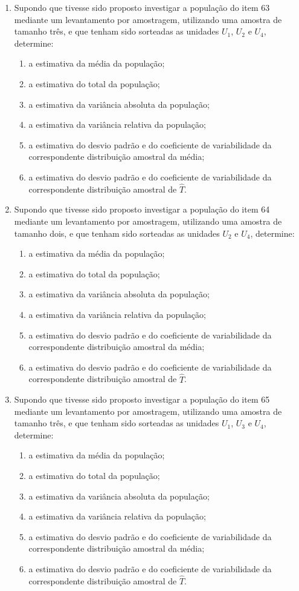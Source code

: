 \begin{enumerate}[resume]
\item Supondo que tivesse sido proposto investigar a população do item 63 mediante um levantamento por amostragem, utilizando uma amostra de tamanho três, e que tenham sido sorteadas as unidades $U_{1}$, $U_{2}$ e $U_{4}$, determine:
	\begin{enumerate}
	\item a estimativa da média da população;
	\item a estimativa do total da população;
	\item a estimativa da variância absoluta da população;
	\item a estimativa da variância relativa da população;
	\item a estimativa do desvio padrão e do coeficiente de variabilidade da correspondente distribuição amostral da média;
	\item a estimativa do desvio padrão e do coeficiente de variabilidade da correspondente distribuição amostral de $\hat{T}$.
	\end{enumerate}
	
\item Supondo que tivesse sido proposto investigar a população do item 64 mediante um levantamento por amostragem, utilizando uma amostra de tamanho dois, e que tenham sido sorteadas as unidades $U_{2}$ e $U_{4}$, determine:
	\begin{enumerate}
	\item a estimativa da média da população;
	\item a estimativa do total da população;
	\item a estimativa da variância absoluta da população;
	\item a estimativa da variância relativa da população;
	\item a estimativa do desvio padrão e do coeficiente de variabilidade da correspondente distribuição amostral da média;
	\item a estimativa do desvio padrão e do coeficiente de variabilidade da correspondente distribuição amostral de $\hat{T}$.
	\end{enumerate}
	
\item Supondo que tivesse sido proposto investigar a população do item 65 mediante um levantamento por amostragem, utilizando uma amostra de tamanho três, e que tenham sido sorteadas as unidades $U_{1}$, $U_{3}$ e $U_{4}$, determine:
	\begin{enumerate}
	\item a estimativa da média da população;
	\item a estimativa do total da população;
	\item a estimativa da variância absoluta da população;
	\item a estimativa da variância relativa da população;
	\item a estimativa do desvio padrão e do coeficiente de variabilidade da correspondente distribuição amostral da média;
	\item a estimativa do desvio padrão e do coeficiente de variabilidade da correspondente distribuição amostral de $\hat{T}$.
	\end{enumerate}	
	

\end{enumerate}
